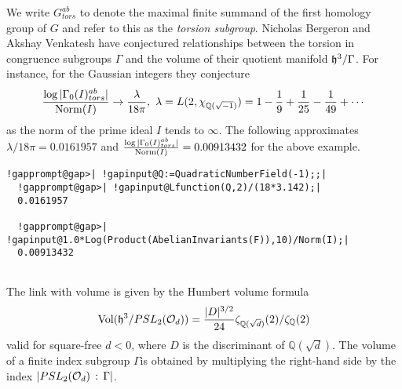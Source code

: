 \documentclass[a4paper,11pt]{report}
\begin{document}
{{\begin{Verbatim}[commandchars=!@|,fontsize=\small,frame=single,label=Example]
\end{Verbatim}
 

We write $G^{ab}_{tors}$ to denote the maximal finite summand of the first homology group of $G$ and refer to this as the \emph{torsion subgroup}. Nicholas Bergeron and Akshay Venkatesh \cite{bergeron} have conjectured relationships between the torsion in congruence subgroups $\Gamma$ and the volume of their quotient manifold ${\frak h}^3/\Gamma$. For instance, for the Gaussian integers they conjecture 
\[ \frac{\log |\Gamma_0(I)_{tors}^{ab}|}{{\rm Norm}(I)} \rightarrow
\frac{\lambda}{18\pi},\ \lambda =L(2,\chi_{\mathbb Q(\sqrt{-1})}) = 1
-\frac{1}{9} + \frac{1}{25} - \frac{1}{49} + \cdots\]
 as the norm of the prime ideal $I$ tends to $\infty$. The following approximates $\lambda/18\pi = 0.0161957$ and $\frac{\log |\Gamma_0(I)_{tors}^{ab}|}{{\rm Norm}(I)} = 0.00913432$ for the above example. 
\begin{Verbatim}[commandchars=!@|,fontsize=\small,frame=single,label=Example]
  !gapprompt@gap>| !gapinput@Q:=QuadraticNumberField(-1);;|
  !gapprompt@gap>| !gapinput@Lfunction(Q,2)/(18*3.142);|
  0.0161957
  
  !gapprompt@gap>| !gapinput@1.0*Log(Product(AbelianInvariants(F)),10)/Norm(I);|
  0.00913432
  
\end{Verbatim}
 

 The link with volume is given by the Humbert volume formula 
\[ {\rm Vol} ( {\frak h}^3 / PSL_2( {\cal O}_{d} ) ) = \frac{|D|^{3/2}}{24}
\zeta_{ \mathbb Q( \sqrt{d} ) }(2)/\zeta_{\mathbb Q}(2) \]
 valid for square-free $d<0$, where $D$ is the discriminant of $\mathbb Q(\sqrt{d})$. The volume of a finite index subgroup $\Gamma$is obtained by multiplying the right-hand side by the index $|PSL_2({\cal O}_d)\,:\, \Gamma|$. }

 }

 
\end{document}

